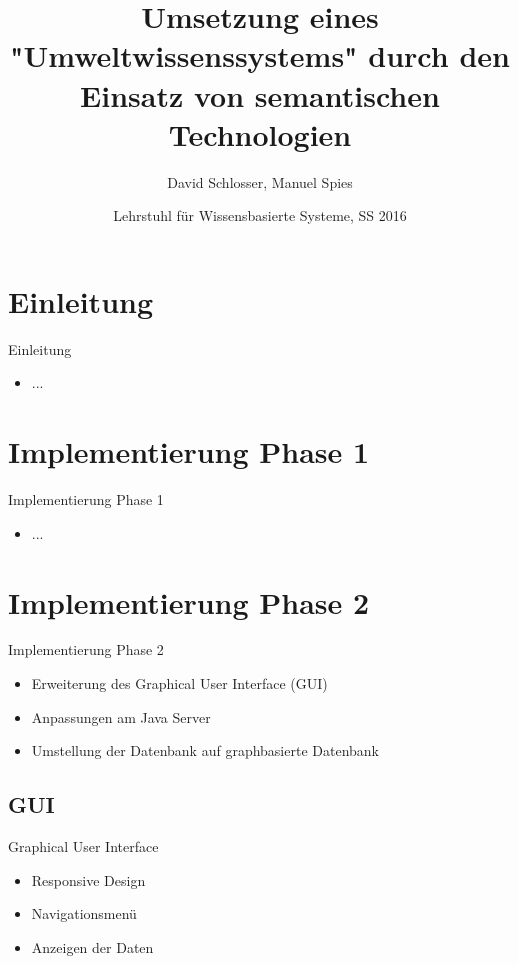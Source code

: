 \documentclass[aspectratio=169]{beamer}
\title[Umwelt PG]{%
  Umsetzung eines "Umweltwissenssystems" durch den Einsatz von semantischen Technologien}
\subtitle{}
\author[David Schlosser, Manuel Spies]{%
  David Schlosser, Manuel Spies}
\date[Lehrstuhl für Wissensbasierte Systeme, SS 2016]{Lehrstuhl für Wissensbasierte Systeme, SS 2016}
\begin{document}
\begin{frame}
  \maketitle
\end{frame}

\section{Einleitung}

\begin{frame}{Einleitung}
  \begin{itemize}
    \item ...
  \end{itemize}
\end{frame}

\section{Implementierung Phase 1}

\begin{frame}{Implementierung Phase 1}
  \begin{itemize}
  	\item ...
  \end{itemize}
\end{frame}

\section{Implementierung Phase 2}

\begin{frame}{Implementierung Phase 2}
  \begin{itemize}
  	\item Erweiterung des Graphical User Interface (GUI)
  	\item Anpassungen am Java Server
  	\item Umstellung der Datenbank auf graphbasierte Datenbank
  \end{itemize}
\end{frame}

\subsection{GUI}

\begin{frame}{Graphical User Interface}
  \begin{itemize}
  	\item Responsive Design
  	\item Navigationsmenü
  	\item Anzeigen der Daten
  \end{itemize}
\end{frame}
\end{document}
